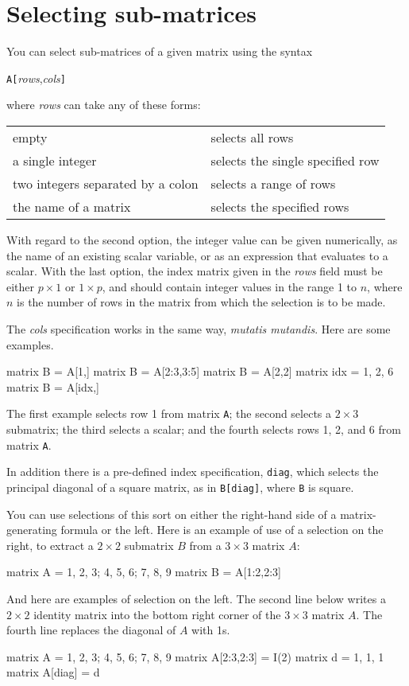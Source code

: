 \section{Selecting sub-matrices}
\label{matrix-sub}

You can select sub-matrices of a given matrix using the syntax

\texttt{A[}\textsl{rows},\textsl{cols}\texttt{]}

where \textsl{rows} can take any of these forms:

\begin{center}
\begin{tabular}{ll}
empty & selects all rows \\
a single integer & selects the single specified row \\
two integers separated by a colon & selects a range of rows \\
the name of a matrix & selects the specified rows \\
\end{tabular}
\end{center}

With regard to the second option, the integer value can be given
numerically, as the name of an existing scalar variable, or as an
expression that evaluates to a scalar.  With the last option, the
index matrix given in the \textsl{rows} field must be either $p\times
1$ or $1\times p$, and should contain integer values in the range 1 to
$n$, where $n$ is the number of rows in the matrix from which the
selection is to be made.

The \textsl{cols} specification works in the same way, \textit{mutatis
  mutandis}.  Here are some examples.
%
\begin{code}
matrix B = A[1,]
matrix B = A[2:3,3:5]
matrix B = A[2,2]
matrix idx = { 1, 2, 6 }
matrix B = A[idx,]
\end{code}
%
The first example selects row 1 from matrix \texttt{A}; the second
selects a $2\times 3$ submatrix; the third selects a scalar; and
the fourth selects rows 1, 2, and 6 from matrix \texttt{A}.

In addition there is a pre-defined index specification, \texttt{diag},
which selects the principal diagonal of a square matrix, as in
\texttt{B[diag]}, where \texttt{B} is square.

You can use selections of this sort on either the right-hand side of
a matrix-generating formula or the left.  Here is an example of use of
a selection on the right, to extract a $2\times 2$ submatrix $B$ from a
$3\times 3$ matrix $A$:
%
\begin{code}
matrix A = { 1, 2, 3; 4, 5, 6; 7, 8, 9 }
matrix B = A[1:2,2:3]
\end{code}
%
And here are examples of selection on the left.  The second line below
writes a $2\times 2$ identity matrix into the bottom right corner of the
$3\times 3$ matrix $A$.  The fourth line replaces the diagonal of $A$ 
with 1s.
%
\begin{code}
matrix A = { 1, 2, 3; 4, 5, 6; 7, 8, 9 }
matrix A[2:3,2:3] = I(2)
matrix d = { 1, 1, 1 }
matrix A[diag] = d
\end{code}

